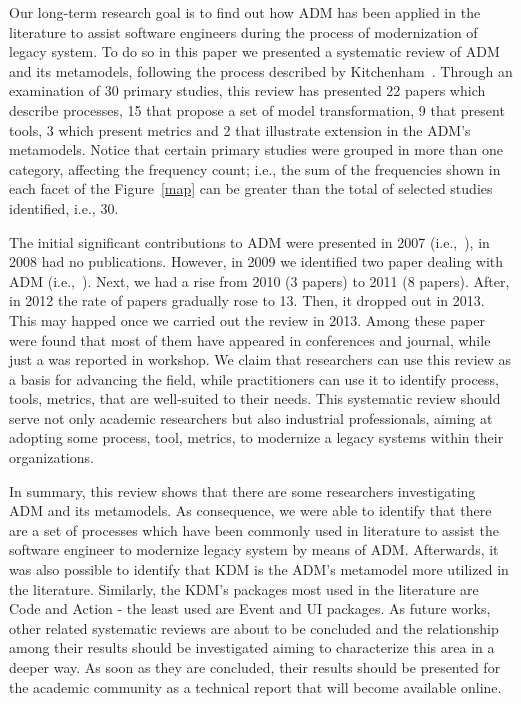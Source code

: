Our long-term research goal is to find out how ADM has been applied in the literature to assist software engineers during the process of modernization of legacy system. To do so in this paper we presented a systematic review of ADM and its metamodels, following the process described by Kitchenham~\cite{Kitchenham}. Through an examination of 30 primary studies, this review has presented 22 papers which describe processes, 15 that propose a set of model transformation, 9 that present tools, 3 which present metrics and 2 that illustrate extension in the ADM's metamodels. Notice that certain primary studies were grouped in more than one category, affecting the frequency count; i.e., the sum of the frequencies shown in each facet of the Figure~\ref{map} can be greater than the total of selected studies identified, i.e., 30. %

The initial significant contributions to ADM were presented in 2007 (i.e.,~\cite{Mazon:2007:MDM:1784489.1784497, Guzman:2007:AAR:1339262.1339532, 4400179}), in 2008 had no publications. However, in 2009 we identified two paper dealing with ADM (i.e.,~\cite{delCastillo:2009:PRP:1529282.1529753, 5328801}). Next, we had a rise from 2010 (3 papers) to 2011 (8 papers). After, in 2012  
the rate of papers gradually rose to 13. Then, it dropped out in 2013. This may happed once we carried out the review in 2013. Among these paper were found that most of them have appeared in conferences and journal, while just a was reported in workshop. We claim that researchers can use this review as a basis for advancing the field, while practitioners can use it to identify process, tools, metrics, that are well-suited to their needs. This systematic review should serve not only academic researchers but also industrial professionals, aiming at adopting some process, tool, metrics, to modernize a legacy systems within their organizations.

In summary, this review shows that there are some researchers investigating ADM and its metamodels. As consequence, we were able to identify that there are a set of processes which have been commonly used in literature to assist the software engineer to modernize legacy system by means of ADM. Afterwards, it was also possible to identify that KDM is the ADM's metamodel more utilized in the literature. Similarly, the KDM's packages most used in the literature are Code and Action - the least used are Event and UI packages. As future works, other related systematic reviews are about to be concluded and the relationship among their results should be investigated aiming to characterize this area in a deeper way. As soon as they are concluded, their results should be presented for the academic community as a technical report that will become available online.





